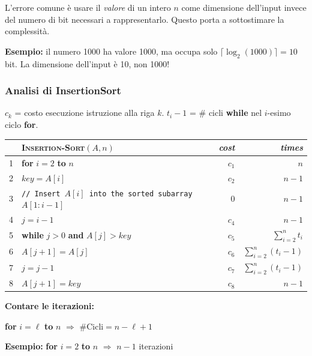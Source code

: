 \begin{nota}
	L'errore comune è usare il \emph{valore} di un intero $n$ come
	dimensione dell'input invece del numero di bit necessari a
	rappresentarlo. Questo porta a sottostimare la complessità.
	
	\textbf{Esempio:} il numero 1000 ha valore 1000, ma occupa solo $\lceil \log_2(1000) \rceil = 10$ bit. La dimensione dell'input è 10, non 1000!
\end{nota}

\subsubsection*{Analisi di InsertionSort}

$c_k$ = costo esecuzione istruzione alla riga $k$. \quad
$t_i - 1$ = \# cicli \textbf{while} nel $i$-esimo ciclo \textbf{for}.

\begin{center}
	\begin{tabular}{rll r r}
		\toprule
		& \textsc{Insertion-Sort}$(A, n)$ & & \textit{cost} & \textit{times} \\
		\midrule
		1 & \textbf{for} $i = 2$ \textbf{to} $n$ & & $c_1$ & $n$ \\
		2 & \quad $key = A[i]$ & & $c_2$ & $n-1$ \\
		3 & \quad \textcolor{codegreen}{\texttt{// Insert $A[i]$ into the sorted subarray $A[1:i-1]$}} & & $0$ & $n-1$ \\
		4 & \quad $j = i - 1$ & & $c_4$ & $n-1$ \\
		5 & \quad \textbf{while} $j > 0$ \textbf{and} $A[j] > key$ & & $c_5$ & $\displaystyle\sum_{i=2}^{n} t_i$ \\[6pt]
		6 & \qquad $A[j+1] = A[j]$ & & $c_6$ & $\displaystyle\sum_{i=2}^{n} (t_i - 1)$ \\[6pt]
		7 & \qquad $j = j - 1$ & & $c_7$ & $\displaystyle\sum_{i=2}^{n} (t_i - 1)$ \\[6pt]
		8 & \quad $A[j+1] = key$ & & $c_8$ & $n-1$ \\
		\bottomrule
	\end{tabular}
\end{center}

\begin{softnote}
	\textbf{Contare le iterazioni:}
	
	\textbf{for} $i = \ell$ \textbf{to} $n$ \quad $\Rightarrow$ \quad $\#\text{Cicli} = n - \ell + 1$
	
	\textbf{Esempio:} \textbf{for} $i = 2$ \textbf{to} $n$ \quad $\Rightarrow$ \quad $n - 1$ iterazioni
\end{softnote}


